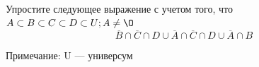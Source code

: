 \question
Упростите следующее выражение с учетом того, что $A\subset B \subset C \subset D \subset U; A \neq \O$
\begin{equation*}
\overline{B} \cap \overline{C} \cap D \cup \overline{A} \cap \overline{C} \cap D \cup \overline{A} \cap B
\end{equation*}

Примечание: U — универсум